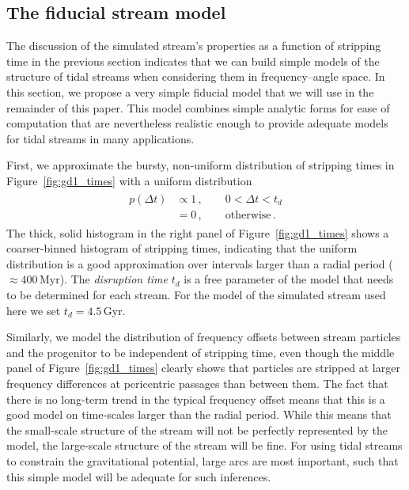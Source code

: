\documentclass[12pt,preprint]{aastex}
\renewcommand{\figurename}{Figure}
\newcommand{\Myr}{\ensuremath{\,\mathrm{Myr}}}
\newcommand{\Gyr}{\ensuremath{\,\mathrm{Gyr}}}
\begin{document}
\subsection{The fiducial stream model}

The discussion of the simulated stream's properties as a function of
stripping time in the previous section indicates that we can build
simple models of the structure of tidal streams when considering them
in frequency--angle space. In this section, we propose a very simple
fiducial model that we will use in the remainder of this paper. This
model combines simple analytic forms for ease of computation that are
nevertheless realistic enough to provide adequate models for tidal
streams in many applications.

First, we approximate the bursty, non-uniform distribution of
stripping times in \figurename~\ref{fig:gd1_times} with a uniform
distribution
\begin{align}\label{eq:pt}
  \begin{split}
    p(\Delta t) & \propto 1\,,\qquad 0 < \Delta t < t_d\\
    & = 0\,,\qquad \mathrm{otherwise}\,.
  \end{split}
\end{align}
The thick, solid histogram in the right panel of
\figurename~\ref{fig:gd1_times} shows a coarser-binned histogram of
stripping times, indicating that the uniform distribution is a good
approximation over intervals larger than a radial period ($\approx
400\Myr$). The \emph{disruption time} $t_d$ is a free parameter of the
model that needs to be determined for each stream. For the model of
the simulated stream used here we set $t_d = 4.5\Gyr$.

Similarly, we model the distribution of frequency offsets between
stream particles and the progenitor to be independent of stripping
time, even though the middle panel of \figurename~\ref{fig:gd1_times}
clearly shows that particles are stripped at larger frequency
differences at pericentric passages than between them. The fact that
there is no long-term trend in the typical frequency offset means that
this is a good model on time-scales larger than the radial
period. While this means that the small-scale structure of the stream
will not be perfectly represented by the model, the large-scale
structure of the stream will be fine. For using tidal streams to
constrain the gravitational potential, large arcs are most important,
such that this simple model will be adequate for such inferences.
\end{document}
